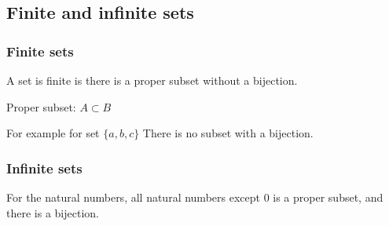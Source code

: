 
\subsection{Finite and infinite sets}


\subsubsection{Finite sets}

A set is finite is there is a proper subset without a bijection.

Proper subset: \(A\subset B\)

For example for set \(\{a,b,c\}\) There is no subset with a bijection.

\subsubsection{Infinite sets}

For the natural numbers, all natural numbers except 0 is a proper subset, and there is a bijection.

